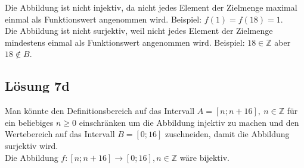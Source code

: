 \documentclass[main.tex]{subfiles}
\begin{document}
Die Abbildung ist nicht injektiv, da nicht jedes Element der Zielmenge maximal einmal als Funktionswert angenommen wird. Beispiel: $f(1) = f(18) = 1$.\\

Die Abbildung ist nicht surjektiv, weil nicht jedes Element der Zielmenge mindestens einmal als Funktionswert angenommen wird. Beispiel: $18\in \mathbb{Z}$ aber $18 \notin B$.

\subsection{Lösung 7d}

Man könnte den Definitionsbereich auf das Intervall $A=[n;n+16],\ n\in \mathbb{Z}$ für ein beliebiges
$n\geq 0$ einschränken um die Abbildung injektiv zu machen und den Wertebereich auf das Intervall
$B=[0;16]$ zuschneiden, damit die Abbildung surjektiv wird.\\

Die Abbildung $f:[ n;n+16]\rightarrow [ 0;16] ,n\in \mathbb{Z}$ wäre bijektiv.
\end{document}
